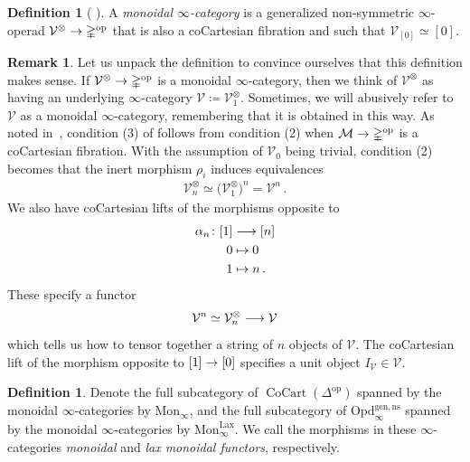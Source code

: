 \documentclass[10pt]{amsart}
\numberwithin{equation}{section}
\theoremstyle{definition}
\newtheorem{definition}[prop]{Definition}
\newtheorem{rem}[prop]{Remark}
\DeclareMathOperator{\op}{op}
\DeclareMathOperator{\Lax}{Lax}
\DeclareMathOperator{\CoCart}{CoCart}
\newcommand{\Simp}{\mathbb{\Delta}}
\newcommand{\cM}{\mathcal{M}}
\newcommand{\cV}{\mathcal{V}}
\newcommand{\Opd}{\mathrm{Opd}^{\mathrm{gen,ns}}_{\infty}}
\newcommand{\Mon}{\mathrm{Mon}_{\infty}}
\newcommand{\MonLax}{\mathrm{Mon}_{\infty}^{\Lax}}
\renewcommand{\to}{\mathchoice{\longrightarrow}{\rightarrow}{}{}}
\begin{document}
	\begin{definition}[{\cite*[Definition 2.2.13]{GH}} ] \label{def:monoidal_infty_cat}
		A \emph{monoidal $\infty$-category} is a generalized non-symmetric $\infty$-operad $\cV^{\otimes} \to \Simp^{\op}$ that is also a coCartesian fibration and such that $\cV_{[0]} \simeq [0]$.
	\end{definition}

	\begin{rem} \label{rem:unwinding_monoidal_cat}
		Let us unpack the definition to convince ourselves that this definition makes sense.
		If $\cV^{\otimes} \to \Simp^{\op}$ is a monoidal $\infty$-category, then we think of $\cV^{\otimes}$ as having an underlying $\infty$-category $\cV\coloneq \cV^{\otimes}_{1}$.
		Sometimes, we will abusively refer to $\cV$ as a monoidal $\infty$-category, remembering that it is obtained in this way.
		As noted in~\cite*[Remark 2.2.15]{GH}, condition (3) of  follows from condition (2) when $\cM\to \Simp^{\op}$ is a coCartesian fibration.
		With the assumption of $\cV_{0}$ being trivial, condition (2) becomes that the inert morphism $\rho_{i}$ induces equivalences
		\begin{align*}
			\cV_{n}^{\otimes} \simeq \bigl(\cV_{1}^{\otimes}\bigr)^{n} = \cV^{n} \,.
		\end{align*}
		We also have coCartesian lifts of the morphisms opposite to
		\begin{align*}
			\alpha_n \colon [1] &\to [n]\\
			0 &\mapsto 0\\
			1 &\mapsto n \,.
		\end{align*}
		These specify a functor
		\begin{align*}
			\cV^{n} \simeq \cV_{n}^{\otimes} \to \cV
		\end{align*}
		which tells us how to tensor together a string of $n$ objects of $\cV$.
		The coCartesian lift of the morphism opposite to $[1] \to [0]$ specifies a unit object $I_{\cV} \in \cV$.
	\end{rem}

	\begin{definition} \label{def:Mon_and_MonLax}
		Denote the full subcategory of $\CoCart(\Simp^{\op})$ spanned by the monoidal $\infty$-categories by $\Mon$, and the full subcategory of $\Opd$ spanned by the monoidal $\infty$-categories by $\MonLax$.
		We call the morphisms in these $\infty$-categories \emph{monoidal} and \emph{lax monoidal functors}, respectively.
	\end{definition}
\end{document}

